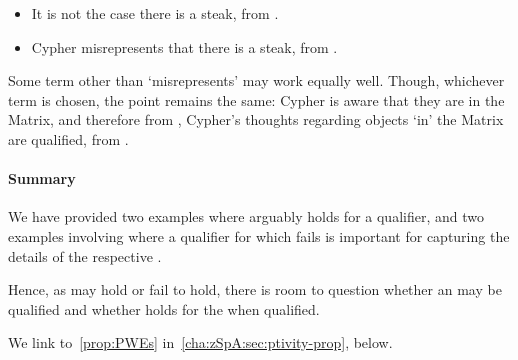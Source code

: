 \begin{note}
  \begin{itemize}[noitemsep]
  \item
    It is not the case there is a steak, from .
  \item
    Cypher misrepresents that there is a steak, from .
  \end{itemize}
  Some term other than `misrepresents' may work equally well.
  Though, whichever term is chosen, the point remains the same:
  Cypher is aware that they are in the Matrix, and therefore from , Cypher's thoughts regarding objects `in' the Matrix are qualified, from .
\end{note}

\paragraph{Summary}

\begin{note}
  We have provided two examples where \ptivity{} arguably holds for a qualifier, and two examples involving  where a qualifier for which \ptivity{} fails is important for capturing the details of the respective .

  Hence, as \ptivity{} may hold or fail to hold, there is room to question whether an \agpe{} may be qualified and whether \ptivity{} holds for the \agpe{} when qualified.

  We link \ptivity{} to~\autoref{prop:PWEs} in~\autoref{cha:zSpA:sec:ptivity-prop}, below.
\end{note}

